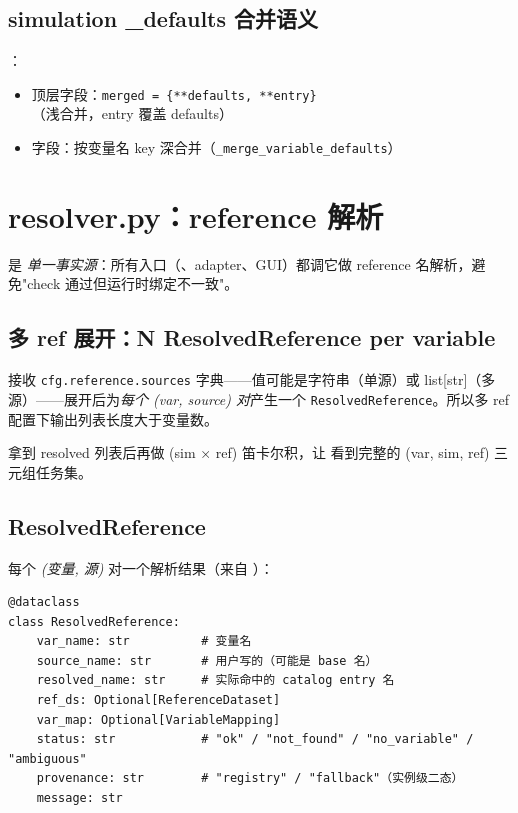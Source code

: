 \subsection{simulation \_defaults 合并语义}

：

\begin{itemize}
  \item 顶层字段：\texttt{merged = \{**defaults, **entry\}}（浅合并，entry 覆盖 defaults）
  \item {} 字段：按变量名 key 深合并（\texttt{\_merge\_variable\_defaults}）
\end{itemize}

\section{resolver.py：reference 解析}

 是 \emph{单一事实源}：所有入口（、adapter、GUI）都调它做 reference 名解析，避免"check 通过但运行时绑定不一致"。

\subsection{多 ref 展开：N ResolvedReference per variable}

 接收 \texttt{cfg.reference.sources} 字典——值可能是字符串（单源）或 list[str]（多源）——展开后为\emph{每个 (var, source) 对}产生一个 \texttt{ResolvedReference}。所以多 ref 配置下输出列表长度大于变量数。

 拿到 resolved 列表后再做 (sim × ref) 笛卡尔积，让  看到完整的 (var, sim, ref) 三元组任务集。

\subsection{ResolvedReference}

每个 \emph{(变量, 源)} 对一个解析结果（来自 ）：

\begin{verbatim}
@dataclass
class ResolvedReference:
    var_name: str          # 变量名
    source_name: str       # 用户写的（可能是 base 名）
    resolved_name: str     # 实际命中的 catalog entry 名
    ref_ds: Optional[ReferenceDataset]
    var_map: Optional[VariableMapping]
    status: str            # "ok" / "not_found" / "no_variable" / "ambiguous"
    provenance: str        # "registry" / "fallback"（实例级二态）
    message: str
\end{verbatim}

